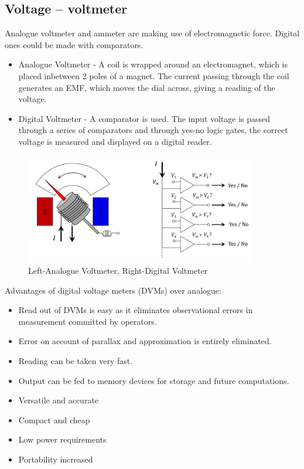 \documentclass[class=report, crop=false, 12pt,a4paper]{standalone}
\begin{document}
\subsection{Voltage – voltmeter}
Analogue voltmeter and ammeter are making use of electromagnetic force. Digital ones could be made with comparators.
\begin{itemize}
  \item Analogue Voltmeter - A coil is wrapped around an electromagnet, which is placed inbetween 2 poles of a magnet. The current passing through the coil generates an EMF, which moves the dial across, giving a reading of the voltage. 
  \item Digital Voltmeter - A comparator is used. The input voltage is passed through a series of comparators and through yes-no logic gates, the correct voltage is measured and displayed on a digital reader.
\end{itemize}
\begin{figure}[H]
  \centering
  \includegraphics[width = 0.9\textwidth]{../img/Mdiagram52.png}
  \caption{Left-Analogue Voltmeter, Right-Digital Voltmeter}
\end{figure}
Advantages of digital voltage meters (DVMs) over analogue:
\begin{itemize}
  \item Read out of DVMs is easy as it eliminates observational errors in measurement committed by operators.
  \item Error on account of parallax and approximation is entirely eliminated.
  \item Reading can be taken very fast.
  \item Output can be fed to memory devices for storage and future computations.
  \item Versatile and accurate
  \item Compact and cheap
  \item Low power requirements
  \item Portability increased
\end{itemize}
\end{document}
